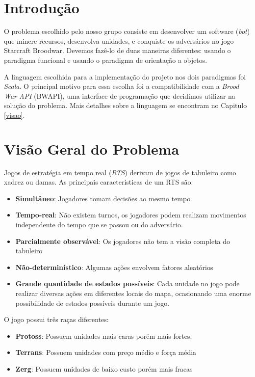 \documentclass[rel_mlp]{iiufrgs}
\begin{document}
%

\chapter{Introdução} \label{intro}

O problema escolhido pelo nosso grupo consiste em desenvolver um software (\textit{bot}) que minere recursos, desenvolva unidades, e conquiste os adversários no jogo Starcraft Broodwar. Devemos fazê-lo de duas maneiras diferentes: usando o paradigma funcional e usando o paradigma de orientação a objetos.

A linguagem escolhida para a implementação do projeto nos dois paradigmas foi \textit{Scala}. O principal motivo para essa escolha foi a compatibilidade com a \textit{Brood War API} (BWAPI), uma interface de programação que decidimos utilizar na solução do problema. Mais detalhes sobre a linguagem se encontram no Capitulo \ref{visao}. 

\chapter{Visão Geral do Problema}\label{problema}
Jogos de estratégia em tempo real (\textit{RTS}) derivam de jogos de tabuleiro como xadrez ou damas. As principais características de um RTS são: 
\begin{itemize}[leftmargin=3em]
\setlength{\itemindent}{1em}
    \item \textbf{Simultâneo}: Jogadores tomam decisões ao mesmo tempo
    \item \textbf{Tempo-real}: Não existem turnos, os jogadores podem realizam movimentos independente do tempo que se passou ou do adversário.
    \item \textbf{Parcialmente observável}: Os jogadores não tem a visão completa do tabuleiro
    \item \textbf{Não-determinístico}: Algumas ações envolvem fatores aleatórios
    \item \textbf{Grande quantidade de estados possíveis}: Cada unidade no jogo pode realizar diversas ações em diferentes locais do mapa, ocasionando uma enorme possibilidade de estados possíveis durante um jogo.
\end{itemize}

O jogo possui três raças diferentes:
\begin{itemize}[leftmargin=3em]
\setlength{\itemindent}{1em}
    \item \textbf{Protoss}: Possuem unidades mais caras porém mais fortes.
    \item \textbf{Terrans}: Possuem unidades com preço médio e força média
    \item \textbf{Zerg}: Possuem unidades de baixo custo porém mais fracas
\end{itemize}
\end{document}
